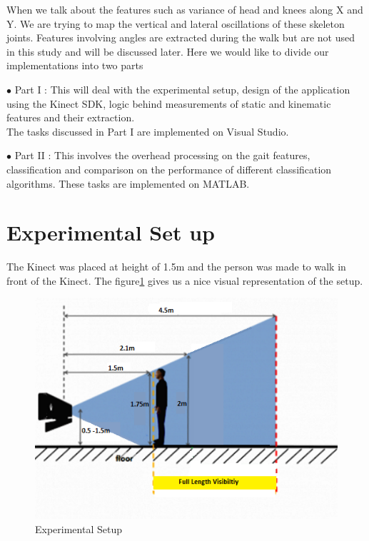 \newpage
\noindent When we talk about the features such as variance of head and knees along X and Y. We are trying to map the vertical and lateral oscillations of these skeleton joints. Features involving angles are extracted during the walk but are not used in this study and will be discussed later. Here we would like to divide our implementations into two parts

\noindent$\bullet$ Part I  : This will deal with the experimental setup, design of the application using the Kinect SDK, logic behind measurements of static and kinematic features and their extraction.\\
The tasks discussed in Part I are implemented on Visual Studio.

\noindent$\bullet$ Part II  : This involves the overhead processing on the gait features, classification and comparison on the performance of different classification algorithms.
These tasks are implemented on MATLAB.

\newpage
\section{Experimental Set up } \label{Experimental Set up }

\noindent The Kinect was placed at height of 1.5m and the person was made to walk in front of the Kinect. The figure\ref{fig:exp.png} gives us a nice visual  representation of the setup.\\
\begin{figure}[h]
\centering
\includegraphics[scale=0.8]{exp.png}
\caption{Experimental Setup}
\label{fig:exp.png}
\end{figure}

